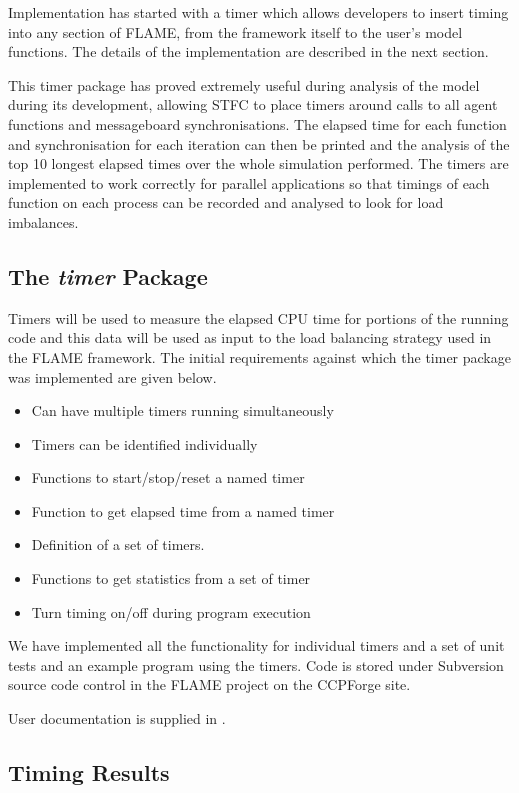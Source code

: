 Implementation has started with a timer which allows developers to insert timing into any section of FLAME, from the framework itself to the user's model functions. The details of the implementation are described in the next section. 

This timer package has proved extremely useful during analysis of the model during its development, allowing STFC to place timers around calls to all agent functions and messageboard synchronisations. The elapsed time for each function and synchronisation for each iteration can then be printed and the analysis of the top 10 longest elapsed times over the whole simulation performed. The timers are implemented to work correctly for parallel applications so that timings of each function on each process can be recorded and analysed to look for load imbalances.

\subsection{The \textit{timer} Package}

Timers will be used to measure the elapsed CPU time for portions of the running code and this data will be used as input to the load balancing strategy used in the FLAME framework. The initial requirements against which the timer package was implemented are given below.

\begin{itemize}
\item Can have multiple timers running simultaneously
\item Timers can be identified individually
\item Functions to start/stop/reset a named timer
\item Function to get elapsed time from a named timer
\item Definition of a set of timers.
\item Functions to get statistics from a set of timer
\item Turn timing on/off during program execution 
\end{itemize}

We have implemented all the functionality for individual timers and a set of unit tests and an example program using the timers. Code is stored under Subversion source code control in the FLAME project on the CCPForge site. 

User documentation is supplied in \cite{TimerAPI}.

\subsection{Timing Results}

